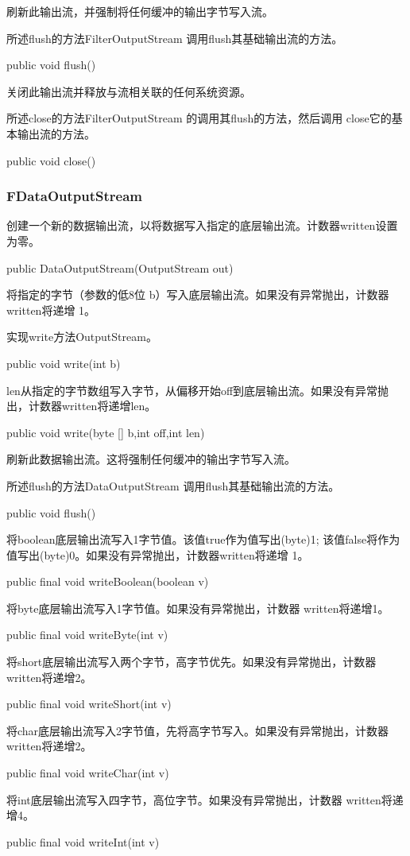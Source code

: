 刷新此输出流，并强制将任何缓冲的输出字节写入流。

所述flush的方法FilterOutputStream 调用flush其基础输出流的方法。
\begin{java}
public void flush()
\end{java}
关闭此输出流并释放与流相关联的任何系统资源。

所述close的方法FilterOutputStream 的调用其flush的方法，然后调用 close它的基本输出流的方法。
\begin{java}
public void close()
\end{java}


\subsubsection{FDataOutputStream}

创建一个新的数据输出流，以将数据写入指定的底层输出流。计数器written设置为零。

\begin{java}
public DataOutputStream(OutputStream  out)
\end{java}
将指定的字节（参数的低8位 b）写入底层输出流。如果没有异常抛出，计数器written将递增 1。

实现write方法OutputStream。
\begin{java}
public void write(int b)
\end{java}
len从指定的字节数组写入字节，从偏移开始off到底层输出流。如果没有异常抛出，计数器written将递增len。
\begin{java}
public void write(byte [] b,int off,int len)
\end{java}
刷新此数据输出流。这将强制任何缓冲的输出字节写入流。

所述flush的方法DataOutputStream 调用flush其基础输出流的方法。
\begin{java}
public void flush()
\end{java}

将boolean底层输出流写入1字节值。该值true作为值写出(byte)1; 该值false将作为值写出(byte)0。如果没有异常抛出，计数器written将递增 1。
\begin{java}
public final void writeBoolean(boolean v)
\end{java}
将byte底层输出流写入1字节值。如果没有异常抛出，计数器 written将递增1。
\begin{java}
public final void writeByte(int v)
\end{java}

将short底层输出流写入两个字节，高字节优先。如果没有异常抛出，计数器 written将递增2。
\begin{java}
public final void writeShort(int v)
\end{java}
将char底层输出流写入2字节值，先将高字节写入。如果没有异常抛出，计数器written将递增2。
\begin{java}
public final void writeChar(int v)
\end{java}
将int底层输出流写入四字节，高位字节。如果没有异常抛出，计数器 written将递增4。
\begin{java}
public final void writeInt(int v)
\end{java}

